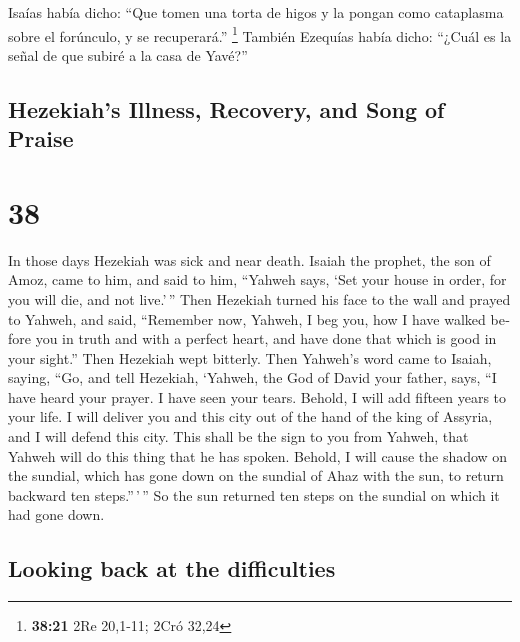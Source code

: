 \begin{paracol}{2}
 Isaías había dicho: ``Que tomen una torta de higos y la
pongan como cataplasma sobre el forúnculo, y se recuperará.''
\footnote{\textbf{38:21} 2Re 20,1-11; 2Cró 32,24} 
También Ezequías había dicho: ``¿Cuál es la señal de que subiré a la
casa de Yavé?''

\switchcolumn
\begin{otherlanguage}{english}

\hypertarget{hezekiahs-illness-recovery-and-song-of-praise}{%
\subsection{Hezekiah's Illness, Recovery, and Song of
Praise}\label{hezekiahs-illness-recovery-and-song-of-praise}}

\hypertarget{section-75}{%
\section{38}\label{section-75}}

 In those days Hezekiah was sick and near death. Isaiah
the prophet, the son of Amoz, came to him, and said to him, ``Yahweh
says, `Set your house in order, for you will die, and not live.'\,''
 Then Hezekiah turned his face to the wall and prayed to
Yahweh,  and said, ``Remember now, Yahweh, I beg you, how
I have walked before you in truth and with a perfect heart, and have
done that which is good in your sight.'' Then Hezekiah wept bitterly.
 Then Yahweh's word came to Isaiah, saying, 
``Go, and tell Hezekiah, `Yahweh, the God of David your father, says,
``I have heard your prayer. I have seen your tears. Behold, I will add
fifteen years to your life.  I will deliver you and this
city out of the hand of the king of Assyria, and I will defend this
city.  This shall be the sign to you from Yahweh, that
Yahweh will do this thing that he has spoken.  Behold, I
will cause the shadow on the sundial, which has gone down on the sundial
of Ahaz with the sun, to return backward ten steps.''\,'\,'' So the sun
returned ten steps on the sundial on which it had gone down.

\hypertarget{looking-back-at-the-difficulties}{%
\subsection{Looking back at the
difficulties}\label{looking-back-at-the-difficulties}}


\end{otherlanguage}
\end{paracol}
